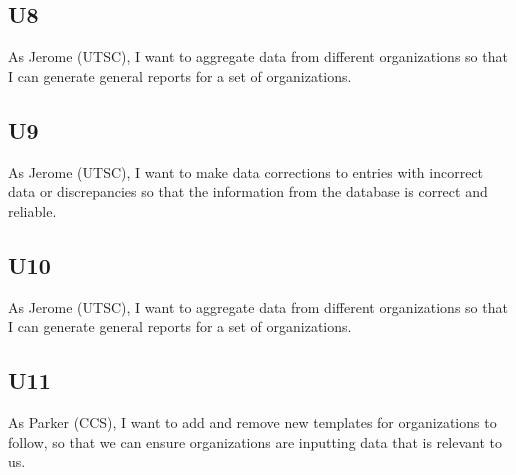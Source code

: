 \documentclass[]{scrartcl}
\begin{document}
\subsection{U8}
As Jerome (UTSC), I want to aggregate data from different organizations so that I can generate general reports for a set of organizations.

\subsection{U9}
As Jerome (UTSC), I want to make data corrections to entries with incorrect data or discrepancies so that the information from the database is correct and reliable.

\subsection{U10}
As Jerome (UTSC), I want to aggregate data from different organizations so that I can generate general reports for a set of organizations.

\subsection{U11}
As Parker (CCS), I want to add and remove new templates for organizations to follow, so that we can ensure organizations are inputting data that is relevant to us.
\end{document}
